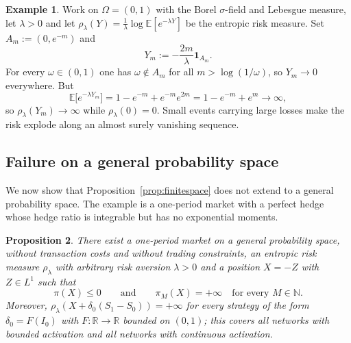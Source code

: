 \documentclass[11pt,a4paper]{report}
\numberwithin{equation}{chapter}
\theoremstyle{plain}
\newtheorem{proposition}{Proposition}[chapter]
\theoremstyle{definition}
\newtheorem{example}[proposition]{Example}
\newcommand{\E}{\mathbb{E}}
\newcommand{\R}{\mathbb{R}}
\newcommand{\N}{\mathbb{N}}
\begin{document}
\begin{example}\label{ex:explosion}
  Work on $\Omega=(0,1)$ with the Borel $\sigma$-field and Lebesgue
  measure, let $\lambda>0$ and let
  $\rho_\lambda(Y)=\frac{1}{\lambda}\log\E[e^{-\lambda Y}]$ be the
  entropic risk measure. Set $A_m:=(0,e^{-m})$ and
  \[
    Y_m:=-\frac{2m}{\lambda}\mathbf{1}_{A_m}.
  \]
  For every $\omega\in(0,1)$ one has $\omega\notin A_m$ for all
  $m>\log(1/\omega)$, so $Y_m\to0$ everywhere. But
  \[
    \E\bigl[e^{-\lambda Y_m}\bigr]=1-e^{-m}+e^{-m}e^{2m}
    =1-e^{-m}+e^{m}\longrightarrow\infty,
  \]
  so $\rho_\lambda(Y_m)\to\infty$ while $\rho_\lambda(0)=0$. Small
  events carrying large losses make the risk explode along an almost
  surely vanishing sequence.
\end{example}

\subsection*{Failure on a general probability space}

We now show that Proposition~\ref{prop:finitespace} does not extend to a general probability space. The example is a one-period
market with a perfect hedge whose hedge ratio is
integrable but has no exponential moments.

\begin{proposition}\label{prop:counterexample}
  There exist a one-period market on a general probability space,
  without transaction costs and without trading constraints, an entropic
  risk measure $\rho_\lambda$ with arbitrary risk aversion $\lambda>0$
  and a position $X=-Z$ with $Z\in L^1$ such that
  \[
    \pi(X)\le0\qquad\text{and}\qquad\pi_M(X)=+\infty\quad\text{for every }M\in\N.
  \]
  Moreover, $\rho_\lambda(X+\delta_0(S_1-S_0))=+\infty$ for \emph{every}
  strategy of the form $\delta_0=F(I_0)$ with $F:\R\to\R$ bounded on
  $(0,1)$; this covers all networks with bounded activation and all
  networks with continuous activation.
\end{proposition}
\end{document}
